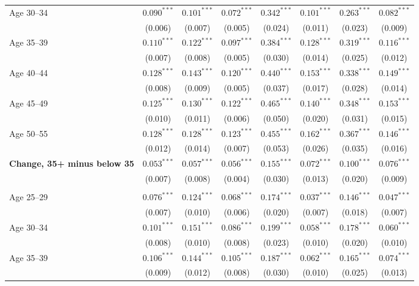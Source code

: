 \begin{table}[!htbp]
{{\begin{tabular}{lccccccc}
Age 30--34 & $0.090^{***}$ & $0.101^{***}$ & $0.072^{***}$ & $0.342^{***}$ & $0.101^{***}$ & $0.263^{***}$ & $0.082^{***}$ \\
 & (0.006) & (0.007) & (0.005) & (0.024) & (0.011) & (0.023) & (0.009) \\
Age 35--39 & $0.110^{***}$ & $0.122^{***}$ & $0.097^{***}$ & $0.384^{***}$ & $0.128^{***}$ & $0.319^{***}$ & $0.116^{***}$ \\
 & (0.007) & (0.008) & (0.005) & (0.030) & (0.014) & (0.025) & (0.012) \\
Age 40--44 & $0.128^{***}$ & $0.143^{***}$ & $0.120^{***}$ & $0.440^{***}$ & $0.153^{***}$ & $0.338^{***}$ & $0.149^{***}$ \\
 & (0.008) & (0.009) & (0.005) & (0.037) & (0.017) & (0.028) & (0.014) \\
Age 45--49 & $0.125^{***}$ & $0.130^{***}$ & $0.122^{***}$ & $0.465^{***}$ & $0.140^{***}$ & $0.348^{***}$ & $0.153^{***}$ \\
 & (0.010) & (0.011) & (0.006) & (0.050) & (0.020) & (0.031) & (0.015) \\
Age 50--55 & $0.128^{***}$ & $0.128^{***}$ & $0.123^{***}$ & $0.455^{***}$ & $0.162^{***}$ & $0.367^{***}$ & $0.146^{***}$ \\
 & (0.012) & (0.014) & (0.007) & (0.053) & (0.026) & (0.035) & (0.016) \\
\textbf{Change, 35+ minus below 35} & $0.053^{***}$ & $0.057^{***}$ & $0.056^{***}$ & $0.155^{***}$ & $0.072^{***}$ & $0.100^{***}$ & $0.076^{***}$ \\
 & (0.007) & (0.008) & (0.004) & (0.030) & (0.013) & (0.020) & (0.009) \\
\addlinespace
\multicolumn{8}{l}{\textit{Black sons}} \\
Age 25--29 & $0.076^{***}$ & $0.124^{***}$ & $0.068^{***}$ & $0.174^{***}$ & $0.037^{***}$ & $0.146^{***}$ & $0.047^{***}$ \\
 & (0.007) & (0.010) & (0.006) & (0.020) & (0.007) & (0.018) & (0.007) \\
Age 30--34 & $0.101^{***}$ & $0.151^{***}$ & $0.086^{***}$ & $0.199^{***}$ & $0.058^{***}$ & $0.178^{***}$ & $0.060^{***}$ \\
 & (0.008) & (0.010) & (0.008) & (0.023) & (0.010) & (0.020) & (0.010) \\
Age 35--39 & $0.106^{***}$ & $0.144^{***}$ & $0.105^{***}$ & $0.187^{***}$ & $0.062^{***}$ & $0.165^{***}$ & $0.074^{***}$ \\
 & (0.009) & (0.012) & (0.008) & (0.030) & (0.010) & (0.025) & (0.013) \\

\end{tabular}}}
\end{table}
